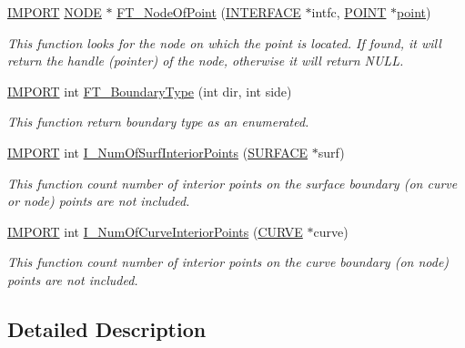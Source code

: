 \begin{DoxyCompactItemize}
\hyperlink{cdecs_8h_a773175d74e73776d69c3e538f17de1ee}{I\+M\+P\+O\+RT} \hyperlink{int_8h_a65acc517559b106aa8e5fe339247ddcd}{N\+O\+DE} $\ast$ \hyperlink{group___q_u_e_r_y_gaadc19788c0b2abe61e6645c4333223e0}{F\+T\+\_\+\+Node\+Of\+Point} (\hyperlink{int_8h_a58cf562d0d320a608294b7310ea167dc}{I\+N\+T\+E\+R\+F\+A\+CE} $\ast$intfc, \hyperlink{int_8h_a3a87c5c9d0146e30a4bf720f701e5a63}{P\+O\+I\+NT} $\ast$\hyperlink{triangle_8c_a27e17773e4939632f373e0938d62cc4f}{point})
\begin{DoxyCompactList}\small\item\em This function looks for the node on which the point is located. If found, it will return the handle (pointer) of the node, otherwise it will return N\+U\+LL. \end{DoxyCompactList}\item 
\hyperlink{cdecs_8h_a773175d74e73776d69c3e538f17de1ee}{I\+M\+P\+O\+RT} int \hyperlink{group___q_u_e_r_y_ga86e03a92306e9bed251fdefaa2c8f318}{F\+T\+\_\+\+Boundary\+Type} (int dir, int side)
\begin{DoxyCompactList}\small\item\em This function return boundary type as an enumerated. \end{DoxyCompactList}\item 
\hyperlink{cdecs_8h_a773175d74e73776d69c3e538f17de1ee}{I\+M\+P\+O\+RT} int \hyperlink{group___q_u_e_r_y_ga7033e33d9d5ed34627e184aa1a4ca83a}{I\+\_\+\+Num\+Of\+Surf\+Interior\+Points} (\hyperlink{int_8h_a1520d8870b5eafd76bd401aecb121ffd}{S\+U\+R\+F\+A\+CE} $\ast$surf)
\begin{DoxyCompactList}\small\item\em This function count number of interior points on the surface boundary (on curve or node) points are not included. \end{DoxyCompactList}\item 
\hyperlink{cdecs_8h_a773175d74e73776d69c3e538f17de1ee}{I\+M\+P\+O\+RT} int \hyperlink{group___q_u_e_r_y_ga2ad484a4da2b2fabdb2257429caec1be}{I\+\_\+\+Num\+Of\+Curve\+Interior\+Points} (\hyperlink{int_8h_a4c1c272bef898dbaa20b055af85cd685}{C\+U\+R\+VE} $\ast$curve)
\begin{DoxyCompactList}\small\item\em This function count number of interior points on the curve boundary (on node) points are not included. \end{DoxyCompactList}\end{DoxyCompactItemize}


\subsection{Detailed Description}


